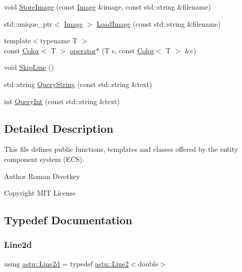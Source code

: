 \begin{DoxyCompactItemize}
\item 
void \hyperlink{group__gfx__group_gaca5f9cb8047c60049300242c20d30cd6}{Store\+Image} (const \hyperlink{classastu_1_1Image}{Image} \&image, const std\+::string \&filename)
\item 
std\+::unique\+\_\+ptr$<$ \hyperlink{classastu_1_1Image}{Image} $>$ \hyperlink{group__gfx__group_ga46ac561eac42d4ace785797db8bc89a0}{Load\+Image} (const std\+::string \&filename)
\item 
{\footnotesize template$<$typename T $>$ }\\const \hyperlink{classastu_1_1Color}{Color}$<$ T $>$ \hyperlink{namespaceastu_aab156e193f46ce5e45fb0b173c3ef878}{operator$\ast$} (T s, const \hyperlink{classastu_1_1Color}{Color}$<$ T $>$ \&c)
\item 
void \hyperlink{namespaceastu_a7cc89ae306750b9cfebac64bb5e9181c}{Skip\+Line} ()
\item 
std\+::string \hyperlink{namespaceastu_ac80dcbf4d76b7e0f3b4e44617e005608}{Query\+String} (const std\+::string \&text)
\item 
int \hyperlink{namespaceastu_ad54c0019fb3e7671e9b32db9cb3d7ebe}{Query\+Int} (const std\+::string \&text)
\end{DoxyCompactItemize}


\subsection{Detailed Description}
This file defines public functions, templates and classes offered by the entity component system (E\+CS). 

\begin{DoxyAuthor}{Author}
Roman Divotkey 
\end{DoxyAuthor}
\begin{DoxyCopyright}{Copyright}
M\+IT License 
\end{DoxyCopyright}


\subsection{Typedef Documentation}
\mbox{\label{namespaceastu_a9e9519d311982af417c5b7fd50fb4515}} 
\subsubsection{\texorpdfstring{Line2d}{Line2d}}
{\footnotesize\ttfamily using \hyperlink{namespaceastu_a9e9519d311982af417c5b7fd50fb4515}{astu\+::\+Line2d} = typedef \hyperlink{classastu_1_1Line2}{astu\+::\+Line2}$<$double$>$}

